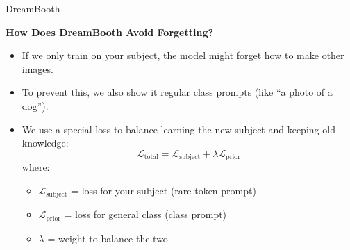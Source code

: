\begin{frame}[allowframebreaks]{DreamBooth}
\framebreak

\textbf{How Does DreamBooth Avoid Forgetting?}
\begin{itemize}
    \item If we only train on your subject, the model might forget how to make other images.
    \item To prevent this, we also show it regular class prompts (like ``a photo of a dog'').
    \item We use a special loss to balance learning the new subject and keeping old knowledge:
    \[
        \mathcal{L}_{\text{total}} = \mathcal{L}_{\text{subject}} + \lambda \mathcal{L}_{\text{prior}}
    \]
    where:
    \begin{itemize}
        \item $\mathcal{L}_{\text{subject}}$ = loss for your subject (rare-token prompt)
        \item $\mathcal{L}_{\text{prior}}$ = loss for general class (class prompt)
        \item $\lambda$ = weight to balance the two
    \end{itemize}
\end{itemize}
\end{frame}

